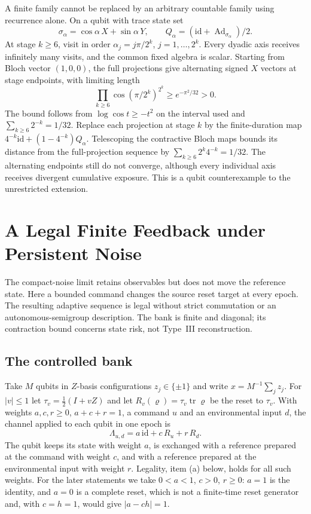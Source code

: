 \documentclass[12pt]{article}
\theoremstyle{definition}
\theoremstyle{remark}
\begin{document}
A finite family cannot be replaced by an arbitrary countable
family using recurrence alone. On a qubit with trace state set
\[
 \sigma_\alpha=\cos\alpha\,X+\sin\alpha\,Y,\qquad
 Q_\alpha=(\mathrm{id}+\operatorname{Ad}_{\sigma_\alpha})/2 .
\]
At stage \(k\ge6\), visit in order
\(\alpha_j=j\pi/2^k\), \(j=1,\ldots,2^k\).
Every dyadic axis receives infinitely many visits, and the
common fixed algebra is scalar. Starting from Bloch vector
\((1,0,0)\), the full projections give alternating signed \(X\)
vectors at stage endpoints, with limiting length
\[
 \prod_{k\ge6}\cos(\pi/2^k)^{2^k}
 \ge e^{-\pi^2/32}>0 .
\]
The bound follows from \(\log\cos t\ge-t^2\) on the interval used
and \(\sum_{k\ge6}2^{-k}=1/32\).
Replace each projection at stage \(k\) by the finite-duration map
\(4^{-k}\mathrm{id}+(1-4^{-k})Q_\alpha\).
Telescoping the contractive Bloch maps bounds its distance from
the full-projection sequence by
\(\sum_{k\ge6}2^k4^{-k}=1/32\).
The alternating endpoints still do not converge, although every
individual axis receives divergent cumulative exposure.
This is a qubit counterexample to the unrestricted extension.

\section{A Legal Finite Feedback under Persistent Noise}\label{sec:bank}

The compact-noise limit retains observables but does not move the
reference state. Here a bounded command changes the source reset
target at every epoch. The resulting adaptive sequence is legal
without strict commutation or an autonomous-semigroup description.
The bank is finite and diagonal; its contraction bound concerns
state risk, not Type~III reconstruction.

\subsection{The controlled bank}\label{subsec:bank_def}

Take $M$ qubits in $Z$-basis configurations $z_j\in\{\pm1\}$ and write $x=M^{-1}\sum_jz_j$. For $|v|\le1$ let $\tau_v=\tfrac12(I+vZ)$ and let $R_v(\varrho)=\tau_v\operatorname{tr}\varrho$ be the reset to $\tau_v$. With weights $a,c,r\ge0$, $a+c+r=1$, a command $u$ and an environmental input $d$, the channel applied to each qubit in one epoch is
\begin{equation}\label{eq:bank_channel}
\Lambda_{u,d}=a\,\mathrm{id}+c\,R_u+r\,R_d .
\end{equation}
The qubit keeps its state with weight $a$, is exchanged with a reference prepared at the command with weight $c$, and with a reference prepared at the environmental input with weight $r$. Legality, item (a) below, holds for all such weights. For the later statements we take $0<a<1$, $c>0$, $r\ge0$: $a=1$ is the identity, and $a=0$ is a complete reset, which is not a finite-time reset generator and, with $c=h=1$, would give $|a-ch|=1$.
\end{document}
